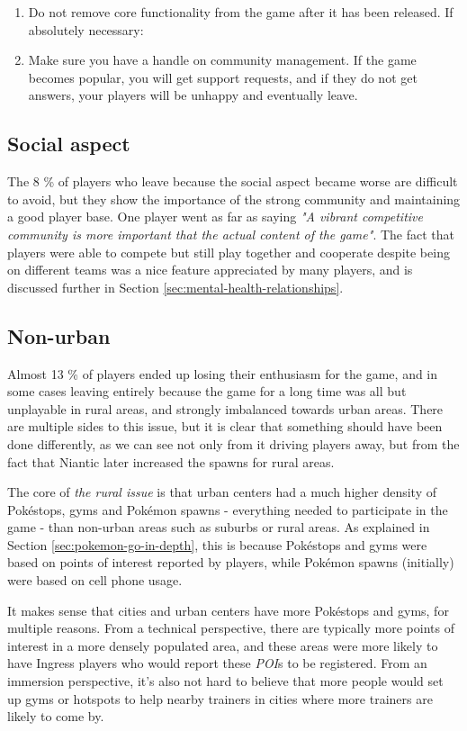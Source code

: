 \begin{enumerate}
	\item Do not remove core functionality from the game after it has been released. If absolutely necessary:
	\item Make sure you have a handle on community management. If the game becomes popular, you will get support requests, and if they do not get answers, your players will be unhappy and eventually leave.
\end{enumerate}

\subsection{Social aspect}
\label{sec:success-factors-social}
The 8 \% of players who leave because the social aspect became worse are difficult to avoid, but they show the importance of the strong community and maintaining a good player base. One player went as far as saying \emph{"A vibrant competitive community is more important that the actual content of the game"}. The fact that players were able to compete but still play together and cooperate despite being on different teams was a nice feature appreciated by many players, and is discussed further in Section \ref{sec:mental-health-relationships}.

\subsection{Non-urban}
\label{sec:the-rural-problem}
Almost 13 \% of players ended up losing their enthusiasm for the game, and in some cases leaving entirely because the game for a long time was all but unplayable in rural areas, and strongly imbalanced towards urban areas. There are multiple sides to this issue, but it is clear that something should have been done differently, as we can see not only from it driving players away, but from the fact that Niantic later increased the spawns for rural areas.

The core of \emph{the rural issue} is that urban centers had a much higher density of Pokéstops, gyms and Pokémon spawns - everything needed to participate in the game - than non-urban areas such as suburbs or rural areas. As explained in Section \ref{sec:pokemon-go-in-depth}, this is because Pokéstops and gyms were based on points of interest reported by players, while Pokémon spawns (initially) were based on cell phone usage.

It makes sense that cities and urban centers have more Pokéstops and gyms, for multiple reasons. From a technical perspective, there are typically more points of interest in a more densely populated area, and these areas were more likely to have Ingress players who would report these \emph{POI}s to be registered. From an immersion perspective, it's also not hard to believe that more people would set up gyms or hotspots to help nearby trainers in cities where more trainers are likely to come by.

